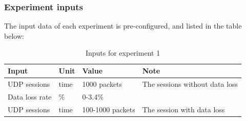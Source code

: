 \documentclass[11pt,openright,a4paper]{report}
\begin{document}
\subsubsection{Experiment inputs}
The input data of each experiment is pre-configured, and listed in the table below:
\begin{table}[H]
	\centering
	\caption{Inputs for experiment 1}
	\label{my-label}
	\begin{tabular}{@{}llll@{}}
		\toprule
		Input          & Unit & Value           & Note                           \\ \midrule
		UDP sessions   & time & 1000 packets    & The sessions without data loss \\
		Data loss rate & \%   & 0-3.4\%         &                                \\
		UDP sessions   & time & 100-1000 packets & The session with data loss     \\ \bottomrule
	\end{tabular}
\end{table}
\end{document}
